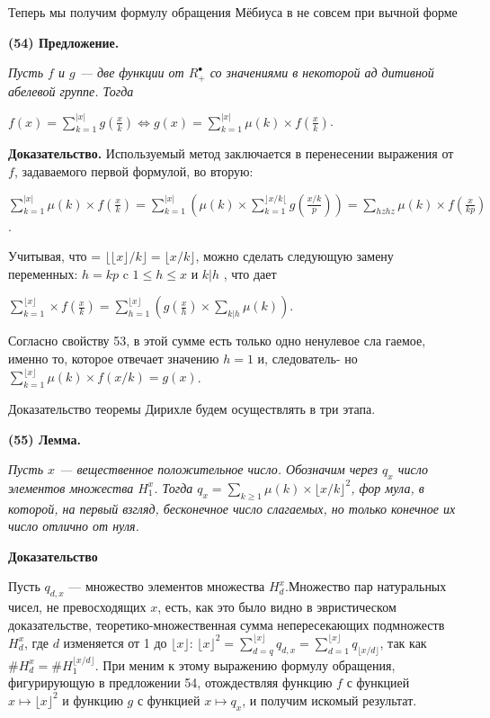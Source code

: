 \documentclass{mai_book}
\begin{document}
Теперь мы получим формулу обращения Мёбиуса в не совсем при­
вычной форме

\textbf{(54) Предложение.}

\textit{Пусть $f$ и $g$ — две функции от $\textit{R}_{+}^{•}$ со значениями в некоторой ад­
дитивной абелевой группе. Тогда
}
\begin{center}
$f(x)=\sum\limits_{k=1}^{|x|} g\left(\frac{x}{k}\right) \Longleftrightarrow g(x)=\sum\limits_{k=1}^{|x|}\mu(k)\times f\left(\frac{x}{k}\right)$.
\end{center}
\textbf{Доказательство.}
Используемый метод заключается в перенесении выражения от $f$,
задаваемого первой формулой, во вторую:
\begin{center}
$\sum\limits_{k=1}^{|x|}\mu(k)\times f\left(\frac{x}{k}\right) =\sum\limits_{k=1}^{|x|}\left(\mu(k)\times\sum\limits_{k=1}^{\rfloor x/k \lfloor} g\left(\frac{x/k}{p}\right)\right)=\sum\limits_{hzhz}\mu(k)\times f\left(\frac{x}{kp}\right)$.
\end{center}
Учитывая, что = $\lfloor\lfloor x \rfloor/k\rfloor = \lfloor x/k\rfloor$, можно сделать следующую замену
переменных: $h=kp$ c $1\leqslant h\leqslant x$ и $k|h$ , что дает
\newpage
\begin{center}
$\sum\limits_{k=1}^{\lfloor x \rfloor}\times f\left(\frac{x}{k}\right)=\sum_{h=1}^{\lfloor x\rfloor}\left( g\left(\frac{x}{h}\right)\times\sum\limits_{k|h}\mu(k)\right)$.
\end{center}
Согласно свойству 53, в этой сумме есть только одно ненулевое сла­
гаемое, именно то, которое отвечает значению $h=1$ и, следователь-
но $\sum\nolimits_{k=1}^{\lfloor x\rfloor}\mu(k)\times f(x/k)=g(x)$.

Доказательство теоремы Дирихле будем осуществлять в три этапа.

\textbf{(55) Лемма.}

\textit{Пусть $x$ — вещественное положительное число. Обозначим через $q_{x}$
число элементов множества $H_{1}^x$. Тогда $q_{x}=\sum\nolimits_{k\geqslant 1}\mu(k)\times\lfloor x/k\rfloor^2$, фор­
мула, в которой, на первый взгляд, бесконечное число слагаемых, но
только конечное их число отлично от нуля.
}

\textbf{Доказательство}

Пусть $q_{d,x}$ — множество элементов множества $H_{d}^x$.Множество пар
натуральных чисел, не превосходящих $x$, есть, как это было видно
в эвристическом доказательстве, теоретико-множественная сумма
непересекающих подмножеств $H_{d}^x$, где $d$ изменяется от 1 до $\lfloor x\rfloor$: $\lfloor x\rfloor^2=\sum\nolimits_{d=q}^{\lfloor x\rfloor}q_{d,x}=\sum\nolimits_{d=1}^{\lfloor x\rfloor}q_{\lfloor x/d\rfloor}$, так как $\#H_{d}^x=\#H_{1}^{\lfloor x/d\rfloor}$. При­
меним к этому выражению формулу обращения, фигурирующую в
предложении 54, отождествляя функцию $f$ с функцией $x\mapsto\lfloor x\rfloor^2$
 и функцию $g$ с функцией $x\mapsto q_{x}$, и получим искомый результат.
 
\end{document}

